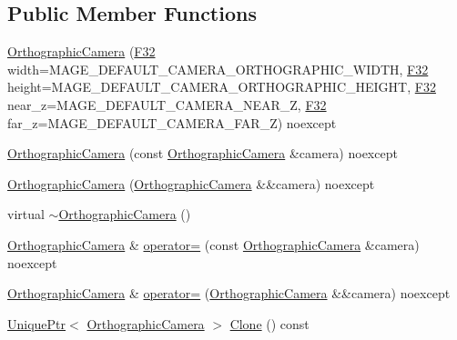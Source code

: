 \subsection*{Public Member Functions}
\begin{DoxyCompactItemize}
\item 
\hyperlink{classmage_1_1_orthographic_camera_a2c99b9827619d168c292172ac21308f1}{Orthographic\+Camera} (\hyperlink{namespacemage_aa97e833b45f06d60a0a9c4fc22ae02c0}{F32} width=M\+A\+G\+E\+\_\+\+D\+E\+F\+A\+U\+L\+T\+\_\+\+C\+A\+M\+E\+R\+A\+\_\+\+O\+R\+T\+H\+O\+G\+R\+A\+P\+H\+I\+C\+\_\+\+W\+I\+D\+TH, \hyperlink{namespacemage_aa97e833b45f06d60a0a9c4fc22ae02c0}{F32} height=M\+A\+G\+E\+\_\+\+D\+E\+F\+A\+U\+L\+T\+\_\+\+C\+A\+M\+E\+R\+A\+\_\+\+O\+R\+T\+H\+O\+G\+R\+A\+P\+H\+I\+C\+\_\+\+H\+E\+I\+G\+HT, \hyperlink{namespacemage_aa97e833b45f06d60a0a9c4fc22ae02c0}{F32} near\+\_\+z=M\+A\+G\+E\+\_\+\+D\+E\+F\+A\+U\+L\+T\+\_\+\+C\+A\+M\+E\+R\+A\+\_\+\+N\+E\+A\+R\+\_\+Z, \hyperlink{namespacemage_aa97e833b45f06d60a0a9c4fc22ae02c0}{F32} far\+\_\+z=M\+A\+G\+E\+\_\+\+D\+E\+F\+A\+U\+L\+T\+\_\+\+C\+A\+M\+E\+R\+A\+\_\+\+F\+A\+R\+\_\+Z) noexcept
\item 
\hyperlink{classmage_1_1_orthographic_camera_ab0ebb2f3cc8fda48867e02990fae360c}{Orthographic\+Camera} (const \hyperlink{classmage_1_1_orthographic_camera}{Orthographic\+Camera} \&camera) noexcept
\item 
\hyperlink{classmage_1_1_orthographic_camera_af5387bb16892ab9ba803a6797d47636a}{Orthographic\+Camera} (\hyperlink{classmage_1_1_orthographic_camera}{Orthographic\+Camera} \&\&camera) noexcept
\item 
virtual \hyperlink{classmage_1_1_orthographic_camera_ac7d1f4ce12a5d0a2539b610f14f59304}{$\sim$\+Orthographic\+Camera} ()
\item 
\hyperlink{classmage_1_1_orthographic_camera}{Orthographic\+Camera} \& \hyperlink{classmage_1_1_orthographic_camera_aa436ca54df7a7ca28642674e8f3db98f}{operator=} (const \hyperlink{classmage_1_1_orthographic_camera}{Orthographic\+Camera} \&camera) noexcept
\item 
\hyperlink{classmage_1_1_orthographic_camera}{Orthographic\+Camera} \& \hyperlink{classmage_1_1_orthographic_camera_a8ea3c026f05b743ee88eb2c1f126238f}{operator=} (\hyperlink{classmage_1_1_orthographic_camera}{Orthographic\+Camera} \&\&camera) noexcept
\item 
\hyperlink{namespacemage_a3316d7143a973e37adf1110f2e80ca31}{Unique\+Ptr}$<$ \hyperlink{classmage_1_1_orthographic_camera}{Orthographic\+Camera} $>$ \hyperlink{classmage_1_1_orthographic_camera_a873f0a715743a7dc104935995696dd33}{Clone} () const

\end{DoxyCompactItemize}

